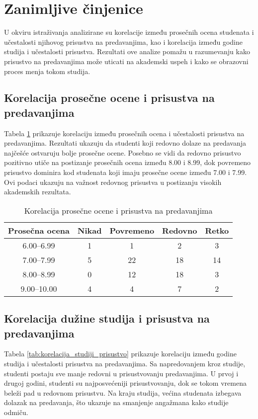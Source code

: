 \documentclass{article}
\begin{document}
\section{Zanimljive činjenice}

U okviru istraživanja analizirane su korelacije između prosečnih ocena studenata i učestalosti njihovog prisustva na predavanjima, kao i korelacija između godine studija i učestalosti prisustva. Rezultati ove analize pomažu u razumevanju kako prisustvo na predavanjima može uticati na akademski uspeh i kako se obrazovni proces menja tokom studija.

\subsection{Korelacija prosečne ocene i prisustva na predavanjima}

Tabela \ref{tab:korelacija_ocena_prisustvo} prikazuje korelaciju između prosečnih ocena i učestalosti prisustva na predavanjima. Rezultati ukazuju da studenti koji redovno dolaze na predavanja najčešće ostvaruju bolje prosečne ocene. Posebno se vidi da redovno prisustvo pozitivno utiče na postizanje prosečnih ocena između 8.00 i 8.99, dok povremeno prisustvo dominira kod studenata koji imaju prosečne ocene između 7.00 i 7.99. Ovi podaci ukazuju na važnost redovnog prisustva u postizanju visokih akademskih rezultata.

\begin{table}[h!]
\centering
\begin{tabular}{|c|c|c|c|c|}
\hline
\textbf{Prosečna ocena} & \textbf{Nikad} & \textbf{Povremeno} & \textbf{Redovno} & \textbf{Retko} \\ \hline
6.00--6.99 & 1 & 1 & 2 & 3 \\ \hline
7.00--7.99 & 5 & 22 & 18 & 14 \\ \hline
8.00--8.99 & 0 & 12 & 18 & 3 \\ \hline
9.00--10.00 & 4 & 4 & 7 & 2 \\ \hline
\end{tabular}
\caption{Korelacija prosečne ocene i prisustva na predavanjima}
\label{tab:korelacija_ocena_prisustvo}
\end{table}

\subsection{Korelacija dužine studija i prisustva na predavanjima}

Tabela \ref{tab:korelacija_studiji_prisustvo} prikazuje korelaciju između godine studija i učestalosti prisustva na predavanjima. Sa napredovanjem kroz studije, studenti postaju sve manje redovni u prisustvovanju predavanjima. U prvoj i drugoj godini, studenti su najposvećeniji prisustvovanju, dok se tokom vremena beleži pad u redovnom prisustvu. Na kraju studija, većina studenata izbegava dolazak na predavanja, što ukazuje na smanjenje angažmana kako studije odmiču.
\end{document}
